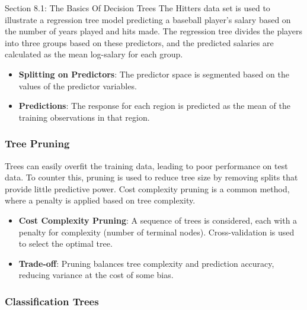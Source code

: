\begin{notes}{Section 8.1: The Basics Of Decision Trees}
    The Hitters data set is used to illustrate a regression tree model predicting a baseball player's salary based on the number of years played and hits made. The regression tree divides the players 
    into three groups based on these predictors, and the predicted salaries are calculated as the mean log-salary for each group.
    
    \begin{highlight}
        \begin{itemize}
            \item \textbf{Splitting on Predictors}: The predictor space is segmented based on the values of the predictor variables.
            \item \textbf{Predictions}: The response for each region is predicted as the mean of the training observations in that region.
        \end{itemize}
    \end{highlight}
    
    \subsubsection*{Tree Pruning}
    
    Trees can easily overfit the training data, leading to poor performance on test data. To counter this, pruning is used to reduce tree size by removing splits that provide little predictive power. 
    Cost complexity pruning is a common method, where a penalty is applied based on tree complexity.
    
    \begin{highlight}
        \begin{itemize}
            \item \textbf{Cost Complexity Pruning}: A sequence of trees is considered, each with a penalty for complexity (number of terminal nodes). Cross-validation is used to select the optimal tree.
            \item \textbf{Trade-off}: Pruning balances tree complexity and prediction accuracy, reducing variance at the cost of some bias.
        \end{itemize}
    \end{highlight}
    
    \subsubsection*{Classification Trees}
    

\end{notes}
